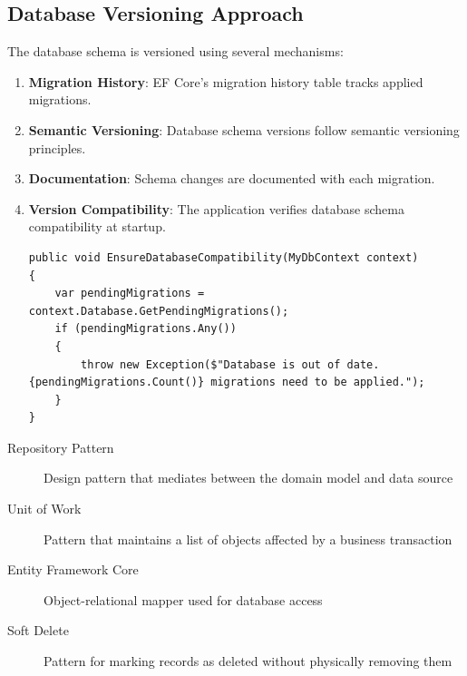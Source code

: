 \subsection{Database Versioning Approach}

The database schema is versioned using several mechanisms:

\begin{enumerate}
   \item \textbf{Migration History}: EF Core's migration history table tracks applied migrations.

   \item \textbf{Semantic Versioning}: Database schema versions follow semantic versioning principles.

   \item \textbf{Documentation}: Schema changes are documented with each migration.

   \item \textbf{Version Compatibility}: The application verifies database schema compatibility at startup.

\begin{verbatim}
public void EnsureDatabaseCompatibility(MyDbContext context)
{
    var pendingMigrations = context.Database.GetPendingMigrations();
    if (pendingMigrations.Any())
    {
        throw new Exception($"Database is out of date. {pendingMigrations.Count()} migrations need to be applied.");
    }
}
\end{verbatim}
\end{enumerate}

\begin{terminology}
\begin{description}
    \item[Repository Pattern] Design pattern that mediates between the domain model and data source
    \item[Unit of Work] Pattern that maintains a list of objects affected by a business transaction
    \item[Entity Framework Core] Object-relational mapper used for database access
    \item[Soft Delete] Pattern for marking records as deleted without physically removing them
\end{description}
\end{terminology}







